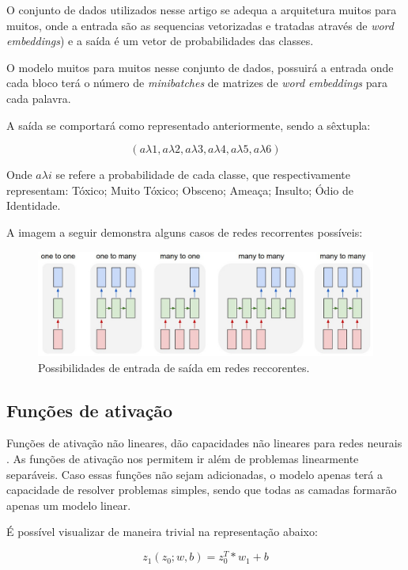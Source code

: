 \documentclass[12pt]{article}
\begin{document}
O conjunto de dados utilizados nesse artigo se adequa a arquitetura muitos para muitos, onde a entrada são as sequencias vetorizadas e tratadas através de \textit{word embeddings}) e a saída é um vetor de probabilidades das classes.

O modelo muitos para muitos nesse conjunto de dados, possuirá a entrada onde cada bloco terá o número de \textit{minibatches} de matrizes de \textit{word embeddings} para cada palavra.

A saída se comportará como representado anteriormente, sendo a sêxtupla:

\[
(a\lambda1, a\lambda2, a\lambda3, a\lambda4, a\lambda5, a\lambda6)
\]

Onde $a \lambda i$ se refere a probabilidade de cada classe, que respectivamente representam: Tóxico; Muito Tóxico; Obsceno; Ameaça; Insulto; Ódio de Identidade.

A imagem a seguir demonstra alguns casos de redes recorrentes possíveis:

\begin{figure}[!htb]
\centering
\includegraphics[width=1\textwidth]{images/rnn-effectiveness-examples.jpeg}
\caption{
    Possibilidades de entrada de saída em redes reccorentes. \cite{karpathy:2015}
}
\label{fig:sigmoid}
\end{figure}

\subsection{Funções de ativação}

Funções de ativação não lineares, dão capacidades não lineares para redes neurais \cite{lecun:98}. As funções de ativação nos permitem ir além de problemas linearmente separáveis. Caso essas funções não sejam adicionadas, o modelo apenas terá a capacidade de resolver problemas simples, sendo que todas as camadas formarão apenas um modelo linear.

É possível visualizar de maneira trivial na representação abaixo:

\begin{equation}
    z_1(z_0; w, b) = z_0^T * w_1 + b
\end{equation}
\end{document}
